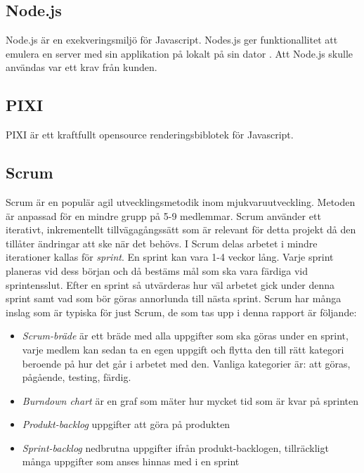 \subsection*{Node.js}
Node.js är en exekveringsmiljö för Javascript. Nodes.js ger funktionallitet att emulera en server med sin applikation på lokalt på sin dator \cite{Nodejs11:online}. Att Node.js skulle användas var ett krav från kunden.

\subsection*{PIXI}
PIXI är ett kraftfullt opensource renderingsbiblotek för Javascript\cite{PixiJSv473:online}.

\subsection*{Scrum}
Scrum är en populär agil utvecklingsmetodik inom mjukvaruutveckling. Metoden är anpassad för en mindre grupp på 5-9 medlemmar. Scrum använder ett iterativt, inkrementellt tillvägagångssätt som är relevant för detta projekt då den tillåter ändringar att ske när det behövs\cite{TheScrum81:online}. I Scrum delas arbetet i mindre iterationer kallas för \textit{sprint}. En sprint kan vara 1-4 veckor lång. Varje sprint planeras vid dess början och då bestäms mål som ska vara färdiga vid sprintensslut. Efter en sprint så utvärderas hur väl arbetet gick under denna sprint samt vad som bör göras annorlunda till nästa sprint. Scrum har många inslag som är typiska för just Scrum, de som tas upp i denna rapport är följande:

\begin{itemize}
	\item \textit{Scrum-bräde} är ett bräde med alla uppgifter som ska göras under en sprint, varje medlem kan sedan ta en egen uppgift och flytta den till rätt kategori beroende på hur det går i arbetet med den. Vanliga kategorier är: att göras, pågående, testing, färdig.
	
	\item \textit{Burndown chart} är en graf som mäter hur mycket tid som är kvar på sprinten
	
	\item \textit{Produkt-backlog} uppgifter att göra på produkten
	
	\item \textit{Sprint-backlog} nedbrutna uppgifter ifrån produkt-backlogen, tillräckligt många uppgifter som anses hinnas med i en sprint
	
\end{itemize}

